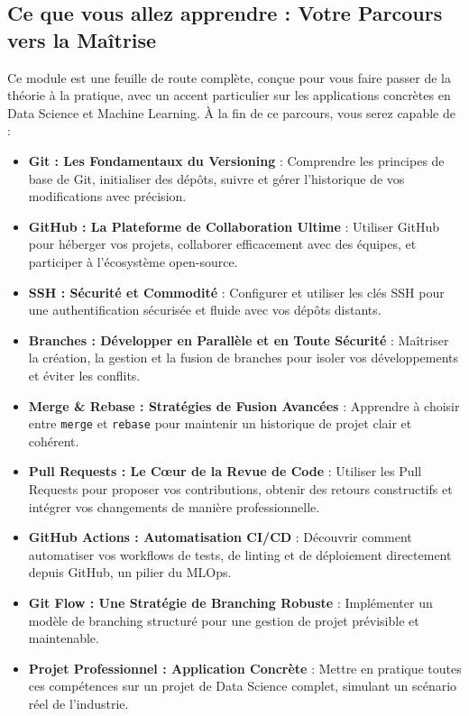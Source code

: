 \documentclass[
  letterpaper,
  DIV=11,
  numbers=noendperiod]{scrreprt}
\providecommand{\tightlist}{%
  \setlength{\itemsep}{0pt}\setlength{\parskip}{0pt}}
\begin{document}
\subsection{Ce que vous allez apprendre : Votre Parcours vers la
Maîtrise}\label{ce-que-vous-allez-apprendre-votre-parcours-vers-la-mauxeetrise}

Ce module est une feuille de route complète, conçue pour vous faire
passer de la théorie à la pratique, avec un accent particulier sur les
applications concrètes en Data Science et Machine Learning. À la fin de
ce parcours, vous serez capable de :

\begin{itemize}
\tightlist
\item
  \textbf{Git : Les Fondamentaux du Versioning} : Comprendre les
  principes de base de Git, initialiser des dépôts, suivre et gérer
  l'historique de vos modifications avec précision.
\item
  \textbf{GitHub : La Plateforme de Collaboration Ultime} : Utiliser
  GitHub pour héberger vos projets, collaborer efficacement avec des
  équipes, et participer à l'écosystème open-source.
\item
  \textbf{SSH : Sécurité et Commodité} : Configurer et utiliser les clés
  SSH pour une authentification sécurisée et fluide avec vos dépôts
  distants.
\item
  \textbf{Branches : Développer en Parallèle et en Toute Sécurité} :
  Maîtriser la création, la gestion et la fusion de branches pour isoler
  vos développements et éviter les conflits.
\item
  \textbf{Merge \& Rebase : Stratégies de Fusion Avancées} : Apprendre à
  choisir entre \texttt{merge} et \texttt{rebase} pour maintenir un
  historique de projet clair et cohérent.
\item
  \textbf{Pull Requests : Le Cœur de la Revue de Code} : Utiliser les
  Pull Requests pour proposer vos contributions, obtenir des retours
  constructifs et intégrer vos changements de manière professionnelle.
\item
  \textbf{GitHub Actions : Automatisation CI/CD} : Découvrir comment
  automatiser vos workflows de tests, de linting et de déploiement
  directement depuis GitHub, un pilier du MLOps.
\item
  \textbf{Git Flow : Une Stratégie de Branching Robuste} : Implémenter
  un modèle de branching structuré pour une gestion de projet prévisible
  et maintenable.
\item
  \textbf{Projet Professionnel : Application Concrète} : Mettre en
  pratique toutes ces compétences sur un projet de Data Science complet,
  simulant un scénario réel de l'industrie.
\end{itemize}
\end{document}
